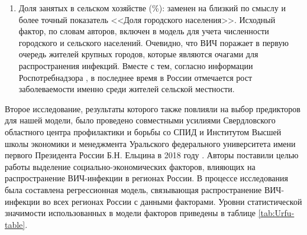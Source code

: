 \begin{enumerate}
        \item Доля занятых в сельском хозяйстве (\%): заменен на близкий по смыслу и более точный показатель <<Доля городского населения>>. Исходный фактор, по словам авторов, включен в модель для учета численности городского и сельского населений. Очевидно, что ВИЧ поражает в первую очередь жителей крупных городов, которые являются очагами для распространения инфекций. Вместе с тем, согласно информации Роспотребнадзора \cite{Доклад_Роспотребнадзор_2023}, в последнее время в России отмечается рост заболеваемости именно среди жителей сельской местности.
        
    \end{enumerate}
    
    Второе исследование, результаты которого также повлияли на выбор предикторов для нашей модели, было проведено совместными усилиями Свердловского областного центра профилактики и борьбы со СПИД и Институтом Высшей школы экономики и менеджмента Уральского федерального университета имени первого Президента России Б.Н. Ельцина в 2018 году \cite{UrFu_socio_factors}. Авторы поставили целью работы выделение социально-экономических факторов, влияющих на распространение ВИЧ-инфекции в регионах России. В процессе исследования была составлена регрессионная модель, связывающая распространение ВИЧ-инфекции во всех регионах России с данными факторами. Уровни статистической значимости использованных в модели факторов приведены в таблице \ref{tab:Urfu-table}.

